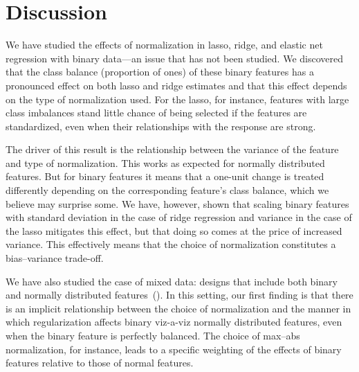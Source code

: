 \section{Discussion}

We have studied the effects of normalization in lasso, ridge, and elastic net regression
with binary data---an issue that has not been studied. We discovered that the class balance
(proportion of ones) of these binary features has a pronounced effect on both lasso and
ridge estimates and that this effect depends on the type of normalization used. For the
lasso, for instance, features with large class imbalances stand little chance of being
selected if the features are standardized, even when their relationships with the response
are strong.

The driver of this result is the relationship between the variance of the feature and type
of normalization. This works as expected for normally distributed features. But for binary
features it means that a one-unit change is treated differently depending on the
corresponding feature's class balance, which we believe may surprise some. We have,
however, shown that scaling binary features with standard deviation in the case of ridge
regression and variance in the case of the lasso mitigates this effect, but that doing so
comes at the price of increased variance. This effectively means that the choice of
normalization constitutes a bias--variance trade-off.


We have also studied the case of mixed data: designs that include both binary and normally
distributed features~(). In this setting, our first finding is that
there is an implicit relationship between the choice of normalization and the manner in
which regularization affects binary viz-a-viz normally distributed features, even when the
binary feature is perfectly balanced. The choice of max--abs normalization, for instance,
leads to a specific weighting of the effects of binary features relative to those of normal
features.

